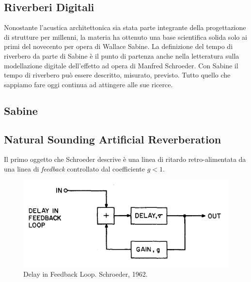 
\begin{refsection}

\section{Riverberi Digitali}
\thispagestyle{empty}

Nonostante l'acustica architettonica sia stata parte integrante della
progettazione di strutture per millenni, la materia ha ottenuto una base
scientifica solida solo ai primi del novecento per opera di Wallace Sabine.
La definizione del tempo di riverbero da parte di Sabine è il punto di partenza
anche nella letteratura sulla modellazione digitale dell'effetto ad opera di
Manfred Schroeder. Con Sabine il tempo di riverbero può essere descritto,
misurato, previsto. Tutto quello che sappiamo fare oggi continua ad attingere
alle sue ricerce.

\subsection{Sabine}

\subsection{Natural Sounding Artificial Reverberation}


Il primo oggetto che Schroeder descrive è una linea di ritardo retro-alimentata
da una linea di \emph{feedback} controllato dal coefficiente $g < 1$.

\begin{figure}[ht]
  \centering
  \includegraphics[width=\textwidth]{CAPITOLI/0500/IMG/dfl.png}
  \caption[]{Delay in Feedback Loop. Schroeder, 1962.}
  \label{schroeder:dfl}
\end{figure}


\end{refsection}
